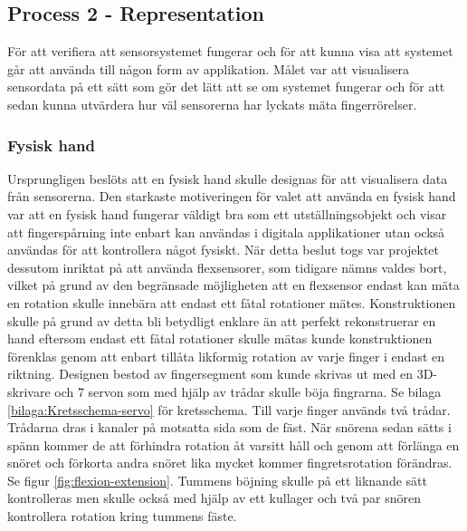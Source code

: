 \documentclass[a4paper]{article}
\makeatletter
\let\\\@raggedtwoe@savedcr%
\makeatother
\begin{document}
\begin{sloppypar}
    \subsection{Process 2 - Representation}

    För att verifiera att sensorsystemet fungerar och för att kunna visa att systemet går att använda till någon form av applikation.
    Målet var att visualisera sensordata på ett sätt som gör det lätt att se om systemet fungerar och för att sedan kunna utvärdera hur väl sensorerna har lyckats mäta fingerrörelser.


    \subsubsection{Fysisk hand}
    Ursprungligen beslöts att en fysisk hand skulle designas för att visualisera data från sensorerna.
    Den starkaste motiveringen för valet att använda en fysisk hand var att en fysisk hand fungerar väldigt bra som ett utställningsobjekt
    och visar att fingerspårning inte enbart kan användas i digitala applikationer utan också användas för att kontrollera något fysiskt.
    När detta beslut togs var projektet dessutom inriktat på att använda flexsensorer, som tidigare nämns valdes bort,
    vilket på grund av den begränsade möjligheten att en flexsensor endast kan mäta en rotation skulle innebära att endast ett fåtal rotationer mätes.
    Konstruktionen skulle på grund av detta bli betydligt enklare än att perfekt rekonstruerar en hand eftersom
    endast ett fåtal rotationer skulle mätas kunde konstruktionen förenklas genom att enbart tillåta likformig rotation av varje finger i endast en riktning.
    \\\\
    Designen bestod av fingersegment som kunde skrivas ut med en 3D-skrivare och 7 servon som med hjälp av trådar skulle böja fingrarna. Se bilaga \ref{bilaga:Kretsschema-servo} för kretsschema.
    Till varje finger används två trådar. Trådarna dras i kanaler på motsatta sida som de fäst.
    När snörena sedan sätts i spänn kommer de att förhindra rotation åt varsitt håll och genom att förlänga en snöret och förkorta andra snöret lika mycket kommer fingretsrotation förändras. Se figur \ref{fig:flexion-extension}.
    Tummens böjning skulle på ett liknande sätt kontrolleras men skulle också med hjälp av ett kullager och två par snören kontrollera rotation kring tummens fäste.



\end{sloppypar}
\end{document}
